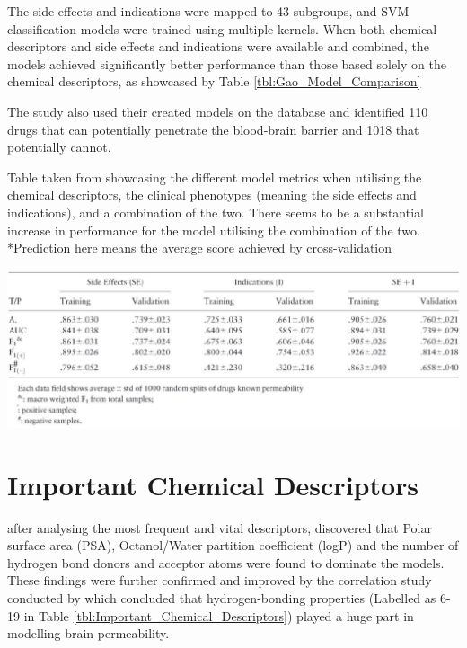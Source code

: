 The side effects and indications were mapped to 43 subgroups, and SVM classification models were trained using multiple kernels. When both chemical descriptors and side effects and indications were available and combined, the models achieved significantly better performance than those based solely on the chemical descriptors, as showcased by Table \ref{tbl:Gao_Model_Comparison}

The study also used their created models on the \citet{SIDER} database and identified 110 drugs that can potentially penetrate the blood-brain barrier and 1018 that potentially cannot.

\begin{table}[!ht]
  \caption{Table taken from \citet{Gao2017} showcasing the different model metrics when utilising the chemical descriptors, the clinical phenotypes (meaning the side effects and indications), and a combination of the two. There seems to be a substantial increase in performance for the model utilising the combination of the two. *Prediction here means the average score achieved by cross-validation}
  \label{tbl:Gao_Model_Comparison}
  \includegraphics[width=1.0\linewidth]{images/Gao_Table_4.pdf}
\end{table}

\section{Important Chemical Descriptors}
\label{sec:Important_Chemical_Descriptors}

\citet{Zhang2008} after analysing the most frequent and vital descriptors, discovered that Polar surface area (PSA), Octanol/Water partition coefficient (logP) and the number of hydrogen bond donors and acceptor atoms were found to dominate the models. These findings were further confirmed and improved by the correlation study conducted by \citet{Zhao2007} which concluded that hydrogen-bonding properties (Labelled as 6-19 in Table \ref{tbl:Important_Chemical_Descriptors}) played a huge part in modelling brain permeability.

